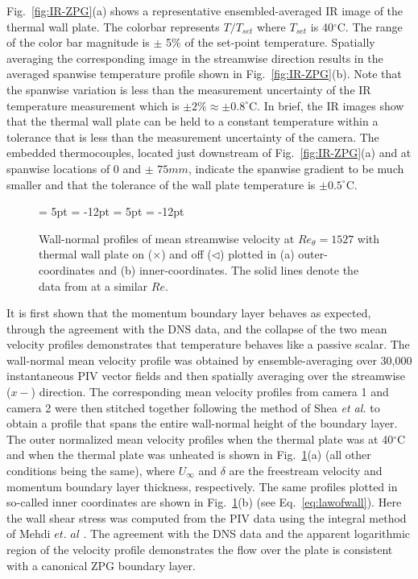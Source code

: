 Fig.~\ref{fig:IR-ZPG}(a) shows a representative ensembled-averaged IR image of the thermal wall plate. 
The colorbar represents $T/T_{set}$ where $T_{set}$ is 40$^\circ$C.
The range of the color bar magnitude is $\pm$ 5\% of the set-point temperature. Spatially averaging the corresponding image in the streamwise direction results in the averaged spanwise temperature profile shown in Fig.~\ref{fig:IR-ZPG}(b). 
Note that the spanwise variation is less than the measurement uncertainty of the IR temperature measurement which is $\pm 2\% \approx \pm 0.8 ^\circ$C.  
In brief, the IR images show that the thermal wall plate can be held to a constant temperature within a tolerance that is less than the measurement uncertainty of the camera. 
The embedded thermocouples, located just downstream of Fig.~\ref{fig:IR-ZPG}(a) and at spanwise locations of 0 and $\pm$ $75mm$, indicate the spanwise gradient to be much smaller and that the tolerance of the wall plate temperature is $\pm 0.5^\circ$C.

\begin{figure}[h!]
  \begin{center}
  {\subfigcapskip = 5pt \subfigcapmargin = -12pt }
   {\subfigcapskip = 5pt \subfigcapmargin = -12pt  }
  \end{center}
 \caption{Wall-normal profiles of mean streamwise velocity at $Re_\theta=1527$ with thermal wall plate on ($\times$)  and off ($\triangleleft$) plotted in (a) outer-coordinates and (b) inner-coordinates. The solid lines denote the data from \cite{Wu2010} at a similar $Re$.}
\label{fig:ZPG-velocity}
\end{figure}

It is first shown that the momentum boundary layer behaves as expected, through the agreement with the DNS data, and the collapse of the two mean velocity profiles demonstrates that temperature behaves like a passive scalar. 
The wall-normal mean velocity profile was obtained by ensemble-averaging over 30,000 instantaneous PIV vector fields and then spatially averaging over the streamwise ($x-$) direction. 
The corresponding mean velocity profiles from camera 1 and camera 2 were then stitched together following the method of Shea \textit{et al.} \cite{Shea2014} to obtain a profile that spans the entire wall-normal height of the boundary layer. 
The outer normalized mean velocity profiles when the thermal plate was at 40$^\circ$C and when the thermal plate was unheated is shown in Fig.~\ref{fig:ZPG-velocity}(a) (all other conditions being the same), where $U_\infty$ and $\delta$ are the freestream velocity and momentum boundary layer thickness, respectively. 
The same profiles plotted in so-called inner coordinates are shown  in Fig.~\ref{fig:ZPG-velocity}(b) (see Eq.~\ref{eq:lawofwall}). 
Here the wall shear stress was computed from the PIV data using the integral method of Mehdi $\textit{et. al}$ \cite{Mehdi2011}.  
The agreement with the DNS data and the apparent logarithmic region of the velocity profile demonstrates the flow over the plate is consistent with a canonical ZPG boundary layer.


